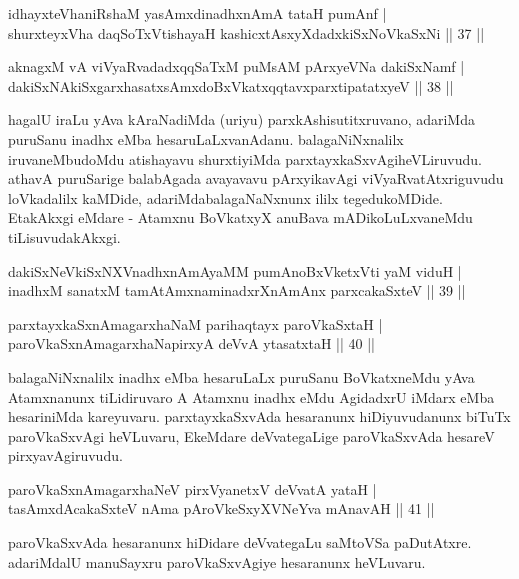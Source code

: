 \begin{shl}
idhayxteV\s haniRshaM yasAmxdinadhxnAmA tataH pumAnf |\\
shurxteyxVha daqSoTxV\s tishayaH kashicxtAsxyXdadxkiSxNoV\s kaSxNi \hfill || 37 || 
\end{shl}

\begin{shl}
aknagxM vA viVyaRvadadxqqSaTxM puMsAM pArxyeVNa dakiSxNamf |\\
dakiSxNAkiSxgarxhasatxsAmxdoBxVkatxqqtavxparxtipatatxyeV \hfill || 38 || 
\end{shl}

\begin{artha}
hagalU iraLu yAva kAraNadiMda (uriyu) parxkAshisutitxru\-vano, adariMda puruSanu inadhx eMba hesaruLaLxvanAdanu. balagaNiNxnalilx iruvaneMbudoMdu atishayavu shurxtiyiMda parxtayxkaSxvAgi\break heVLiruvudu. athavA puruSarige balabAgada avayavavu pArxyikavAgi viVyaRvatAtxriguvudu loVkadalilx kaMDide, adariMda\break balagaNaNxnunx ililx tegedukoMDide. EtakAkxgi eMdare - Atamxnu BoVkatxyX anuBava mADikoLuLxvaneMdu tiLisuvudakAkxgi.
\end{artha}

\begin{shl}
dakiSxNeV\s kiSxNXVnadhxnAmA\s yaMM pumAnoBxVketxVti yaM viduH |\\
inadhxM sanatxM tamAtAmxnaminadxrXnAmAnx parxcakaSxteV \hfill || 39 || 
\end{shl}

\begin{shl}
parxtayxkaSxnAmagarxhaNaM parihaqtayx paroVkaSxtaH |\\
paroVkaSxnAmagarxhaNapirxyA deVvA ytasatxtaH \hfill || 40 || 
\end{shl}

\begin{artha}
balagaNiNxnalilx inadhx eMba hesaruLaLx puruSanu BoVkatxneMdu yAva Atamxnanunx tiLidiruvaro A Atamxnu inadhx eMdu AgidadxrU iMdarx eMba hesariniMda kareyuvaru. parxtayxkaSxvAda hesaranunx hiDiyuvudanunx biTuTx paroVkaSxvAgi heVLuvaru, EkeMdare deVvategaLige paroVkaSxvAda hesareV pirxyavAgiruvudu.
\end{artha}

\begin{shl}
paroVkaSxnAmagarxhaNeV pirxVyanetxV deVvatA yataH |\\
tasAmxdAcakaSxteV nAma pAroVkeSxyXVNeYva mAnavAH \hfill || 41 || 
\end{shl}

\begin{artha}
paroVkaSxvAda hesaranunx hiDidare deVvategaLu saMtoVSa paDutAtxre. adariMdalU manuSayxru paroVkaSxvAgiye hesaranunx heVLuvaru.
\end{artha}

